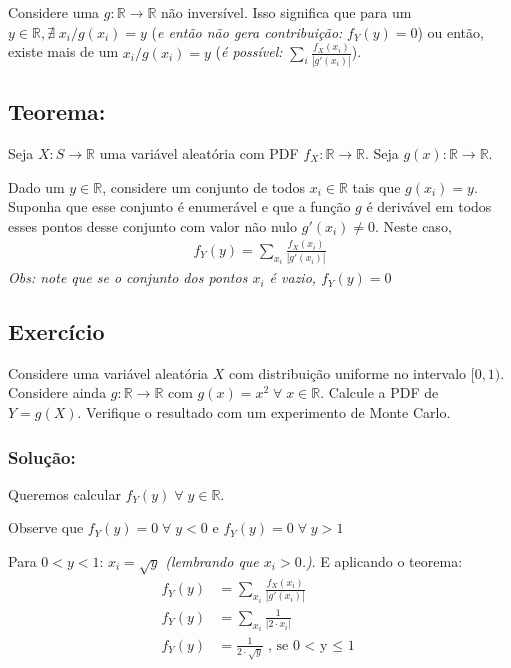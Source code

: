 \documentclass{article}
\renewcommand\it[1]{\textit{#1}}
\newcommand{\bb}[1]{\mathbb{#1}}
\begin{document}
Considere uma $g: \bb{R} \rightarrow \bb{R}$ não inversível. Isso significa que para um $y \in
\bb{R}, \nexists \; x_i / g(x_i) = y$ (\it{e então não gera contribuição:} $f_Y(y) = 0$) ou então,
existe mais de um $x_i / g(x_i) = y$ (\it{é possível:} $\sum_i \frac{f_X(x_i)}{|g'(x_i)|}$).

\subsection*{Teorema:}
Seja $X: S \rightarrow \bb{R}$ uma variável aleatória com PDF $f_X: \bb{R} \rightarrow \bb{R}$.
Seja $g(x): \bb{R} \rightarrow \bb{R}$.

Dado um $y \in \bb{R}$, considere um conjunto de todos $x_i \in \bb{R}$ tais que $g(x_i) = y$.
Suponha que esse conjunto é enumerável e que a função $g$ é derivável em todos esses pontos desse
conjunto com valor não nulo $g'(x_i) \neq 0$. Neste caso,
\begin{align*}
    f_Y(y) = \sum_{x_i} \frac{f_X(x_i)}{|g'(x_i)|}
\end{align*}
\it{Obs: note que se o conjunto dos pontos $x_i$ é vazio, $f_Y(y) = 0$}

\subsection{Exercício}
Considere uma variável aleatória $X$ com distribuição uniforme no intervalo $[0,1)$. Considere
ainda $g: \bb{R} \rightarrow \bb{R}$ com $g(x) = x^2 \; \forall \; x \in \bb{R}$. Calcule a PDF de
$Y = g(X)$. Verifique o resultado com um experimento de Monte Carlo.

\subsubsection*{Solução:}
Queremos calcular $f_Y(y) \; \forall \; y \in \bb{R}$.

Observe que $f_Y(y) = 0 \; \forall \; y < 0$ e $f_Y(y) = 0 \; \forall \; y > 1$

Para $0 < y < 1$: $x_i = \sqrt{y}$ \it{(lembrando que $x_i > 0$.)}. E aplicando o teorema:
\begin{align*}
    f_Y(y) &= \sum_{x_i} \frac{f_X(x_i)}{|g'(x_i)|} \\
    f_Y(y) &= \sum_{x_i} \frac{1}{|2 \cdot x_i |} \\
    f_Y(y) &= \frac{1}{2 \cdot \sqrt{y}} \text{, se 0 < y $\leq$ 1} \\
\end{align*}
\end{document}
